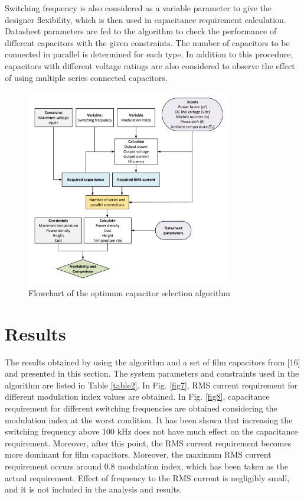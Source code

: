 \documentclass[conference,a4paper,twocolumn]{IEEEtran}
\begin{document}
Switching frequency is also considered as a variable parameter to give the designer flexibility, which is then used in capacitance requirement calculation. Datasheet parameters are fed to the algorithm to check the performance of different capacitors with the given constraints. The number of capacitors to be connected in parallel is determined for each type. In addition to this procedure, capacitors with different voltage ratings are also considered to observe the effect of using multiple series connected capacitors.



\begin{figure}[h]
  \centering
  \includegraphics[width=9cm]{fig6}
  \caption{Flowchart of the optimum capacitor selection algorithm}
  \label{fig6}
\end{figure}



\section{Results}

The results obtained by using the algorithm and a set of film capacitors from [16] and presented in this section. The system parameters and constraints used in the algorithm are listed in Table \ref{table2}. In Fig. \ref{fig7}, RMS current requirement for different modulation index values are obtained. In Fig. \ref{fig8}, capacitance requirement for different switching frequencies are obtained considering the modulation index at the worst condition. It has been shown that increasing the switching frequency above 100 kHz does not have much effect on the capacitance requirement. Moreover, after this point, the RMS current requirement becomes more dominant for film capacitors. Moreover, the maximum RMS current requirement occurs around 0.8 modulation index, which has been taken as the actual requirement. Effect of frequency to the RMS current is negligibly small, and it is not included in the analysis and results.
\end{document}

